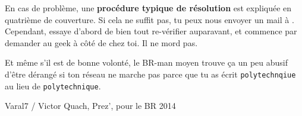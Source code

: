 \vspace{1em}
En cas de problème, une \textbf{procédure typique de résolution} est expliquée en quatrième de couverture. Si cela ne suffit pas, tu peux nous envoyer un mail à . Cependant, essaye d’abord de bien tout re-vérifier auparavant, et commence par demander au geek à côté de chez toi. Il ne mord pas.

Et même s’il est de bonne volonté, le BR-man moyen trouve ça un peu abusif d’être dérangé si ton réseau ne marche pas parce que tu as écrit \texttt{polytechnqiue} au lieu de \texttt{polytechnique}.
\vspace{1.5em}

\hfill Varal7 / Victor Quach, Prez', pour le BR 2014


\vfill


